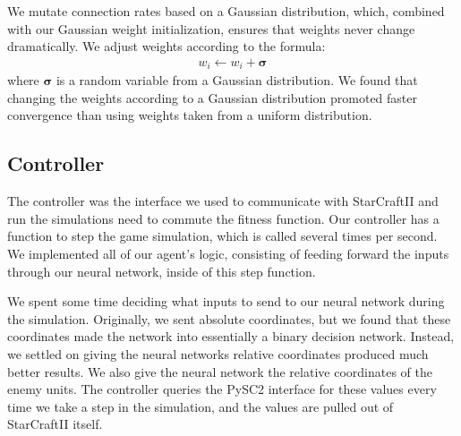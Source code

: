 \documentclass{article}
\begin{document}
We mutate connection rates based on a Gaussian distribution, which, combined
with our Gaussian weight initialization, ensures that weights never change
dramatically. We adjust weights according to the formula:
\begin{align}
  w_i \leftarrow w_i + \bm{\sigma}
\end{align}
where $\bm{\sigma}$ is a random variable from a Gaussian
distribution. We found that changing the weights according to a Gaussian
distribution promoted faster convergence than using weights taken from a uniform
distribution.

\subsection{Controller}
The controller was the interface we used to communicate with StarCraftII and run
the simulations need to commute the fitness function. Our controller has a
function to step the game simulation, which is called several times per
second. We implemented all of our agent's logic, consisting of feeding forward
the inputs through our neural network, inside of this step function.

We spent some time deciding what inputs to send to our neural network during the
simulation. Originally, we sent absolute coordinates, but we found that these
coordinates made the network into essentially a binary decision
network. Instead, we settled on giving the neural networks relative coordinates
produced much better results. We also give the neural network the relative
coordinates of the enemy units. The controller queries the PySC2 interface for
these values every time we take a step in the simulation, and the values are
pulled out of StarCraftII itself.


\end{document}
